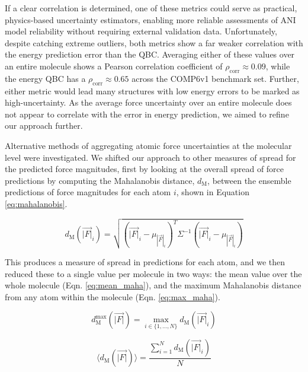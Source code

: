 If a clear correlation is determined, one of these metrics could serve as practical, physics-based uncertainty estimators, enabling more reliable assessments of ANI model reliability without requiring external validation data.
Unfortunately, despite catching extreme outliers, both metrics show a far weaker correlation with the energy prediction error than the QBC.
Averaging either of these values over an entire molecule shows a Pearson correlation coefficient of $\rho_{\text{corr}} \approx 0.09$, while the energy QBC has a $\rho_{\text{corr}} \approx 0.65$ across the COMP6v1 benchmark set.
Further, either metric would lead many structures with low energy errors to be marked as high-uncertainty.
As the average force uncertainty over an entire molecule does not appear to correlate with the error in energy prediction, we aimed to refine our approach further.

Alternative methods of aggregating atomic force uncertainties at the molecular level were investigated. 
We shifted our approach to other measures of spread for the predicted force magnitudes, first by looking at the overall spread of force predictions by computing the Mahalanobis distance, $d_\text{M}$, between the ensemble predictions of force magnitudes for each atom $i$, shown in Equation \ref{eq:mahalanobis}.

\begin{equation}
    d_\text{M}\left(\vec{|F|}_i\right) = \sqrt{ \left( \vec{|F|}_i - \mu_{|\vec{F}|_i} \right)^T {\Sigma}^{-1} \left( \vec{|F|}_i - \mu_{|\vec{F}|_i} \right) }
    \label{eq:mahalanobis}
\end{equation}

This produces a measure of spread in predictions for each atom, and we then reduced these to a single value per molecule in two ways: the mean value over the whole molecule (Eqn. \ref{eq:mean_maha}), and the maximum Mahalanobis distance from any atom within the molecule (Eqn. \ref{eq:max_maha}).

\begin{equation}
    d_\text{M}^\text{max} \left(\vec{|F|}\right) = \max_{i \in \{1, \dots, N\}} d_\text{M} \left( \vec{|F|}_i \right)
    \label{eq:max_maha}
\end{equation}

\begin{equation}
    \langle d_\text{M} \left(\vec{|F|}\right) \rangle = \frac{\sum_{i=1}^{N} d_\text{M} \left( \vec{|F|}_i \right)} {N}
    \label{eq:mean_maha}
\end{equation}

